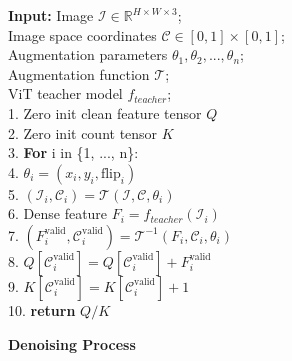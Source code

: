 \documentclass{article}
\begin{document}
\renewcommand{\figurename}{Algorithm}
\begin{figure}
\vspace{-0.5em}
\begin{minipage}{1.0\linewidth}
  \begin{algorithm}[H]
  \caption{\textbf{Denoising Process}}
  \label{distill_algo}
    \textbf{Input:} Image $\mathcal{I}\in\mathbb{R}^{H\times W \times 3}$;\\
    \hspace{10.7mm}Image space coordinates $\mathcal{C}\in [0,1] \times [0,1]$;\\
    \hspace{10.7mm}Augmentation parameters $\theta_{1}, \theta_{2},..., \theta_{n}$;\\ 
    \hspace{10.7mm}Augmentation function $\mathcal{T}$;\\
    \hspace{10.7mm}ViT teacher model $f_{teacher}$; 
\\
1. Zero init clean feature tensor $Q$\\
2. Zero init count tensor $K$\\
3. \textbf{For} i in \{1, ..., n\}:\\
4. \hspace{6.0mm} $\theta_i =(x_i, y_i, \text{flip}_i)$ 
\\
5. \hspace{6.0mm} $(\mathcal{I}_i,\mathcal{C}_i) = \mathcal{T}(\mathcal{I}, \mathcal{C}, \theta_i)$\\
6. \hspace{6.0mm} Dense feature $F_i = f_{teacher}(\mathcal{I}_i)$\\
7. \hspace{6.0mm}$(F^\text{valid}_i,\mathcal{C}^\text{valid}_i) = \mathcal{T}^{-1}(F_i, \mathcal{C}_i, \theta_i)$\\
8. \hspace{6.0mm}$Q[\mathcal{C}^\text{valid}_i]=Q[\mathcal{C}^\text{valid}_i]+F^\text{valid}_i$\\
9. \hspace{6.0mm}$K[\mathcal{C}^\text{valid}_i]=K[\mathcal{C}^\text{valid}_i]+1$\\
10. \textbf{return} $Q/K$
  \end{algorithm}
\end{minipage}\vspace{-0.1em}
\end{figure}
\vspace{-0.5em}
\renewcommand{\figurename}{Figure}
\end{document}
